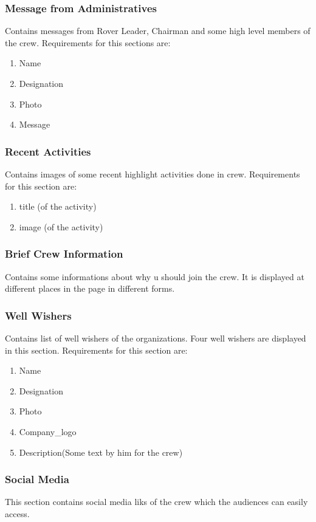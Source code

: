 			\subsubsection{Message from Administratives}
				Contains messages from Rover Leader, Chairman and some high level members of the crew. Requirements for this sections are:
				\begin{enumerate}
					\item Name
					\item Designation
					\item Photo
					\item Message
				\end{enumerate}
			\subsubsection{Recent Activities}
				Contains images of some recent highlight activities done in crew. Requirements for this section are:
				\begin{enumerate}
					\item title (of the activity)
					\item image (of the activity)
				\end{enumerate}
			\subsubsection{Brief Crew Information}
				Contains some informations about why u should join the crew. It is displayed at different places in the page in different forms.
			\subsubsection{Well Wishers}
				Contains list of well wishers of the organizations. Four well wishers are displayed in this section. Requirements for this section are:
				\begin{enumerate}
					\item Name
					\item Designation
					\item Photo
					\item Company\_logo
					\item Description(Some text by him for the crew)
				\end{enumerate}
			\subsubsection{Social Media}
				This section contains social media liks of the crew which the audiences can easily access.
